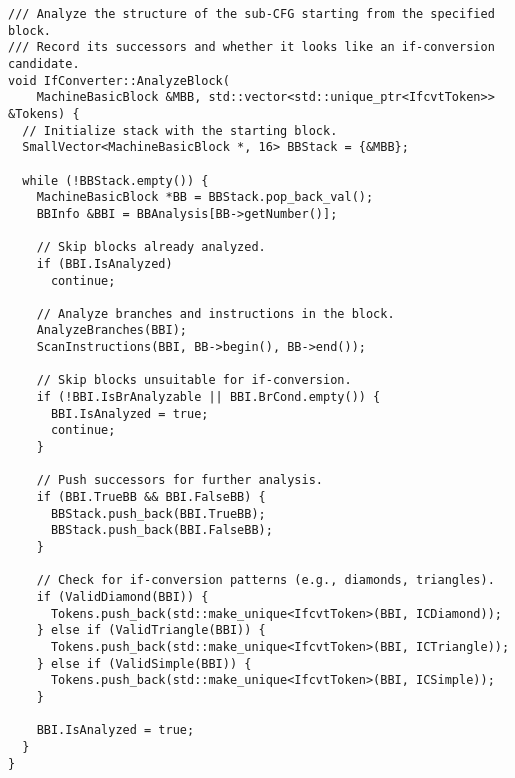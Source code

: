\begin{lstlisting}[style=CStyle]
/// Analyze the structure of the sub-CFG starting from the specified block.
/// Record its successors and whether it looks like an if-conversion candidate.
void IfConverter::AnalyzeBlock(
    MachineBasicBlock &MBB, std::vector<std::unique_ptr<IfcvtToken>> &Tokens) {
  // Initialize stack with the starting block.
  SmallVector<MachineBasicBlock *, 16> BBStack = {&MBB};

  while (!BBStack.empty()) {
    MachineBasicBlock *BB = BBStack.pop_back_val();
    BBInfo &BBI = BBAnalysis[BB->getNumber()];

    // Skip blocks already analyzed.
    if (BBI.IsAnalyzed) 
      continue;

    // Analyze branches and instructions in the block.
    AnalyzeBranches(BBI);
    ScanInstructions(BBI, BB->begin(), BB->end());

    // Skip blocks unsuitable for if-conversion.
    if (!BBI.IsBrAnalyzable || BBI.BrCond.empty()) {
      BBI.IsAnalyzed = true;
      continue;
    }

    // Push successors for further analysis.
    if (BBI.TrueBB && BBI.FalseBB) {
      BBStack.push_back(BBI.TrueBB);
      BBStack.push_back(BBI.FalseBB);
    }

    // Check for if-conversion patterns (e.g., diamonds, triangles).
    if (ValidDiamond(BBI)) {
      Tokens.push_back(std::make_unique<IfcvtToken>(BBI, ICDiamond));
    } else if (ValidTriangle(BBI)) {
      Tokens.push_back(std::make_unique<IfcvtToken>(BBI, ICTriangle));
    } else if (ValidSimple(BBI)) {
      Tokens.push_back(std::make_unique<IfcvtToken>(BBI, ICSimple));
    }

    BBI.IsAnalyzed = true;
  }
}
\end{lstlisting}